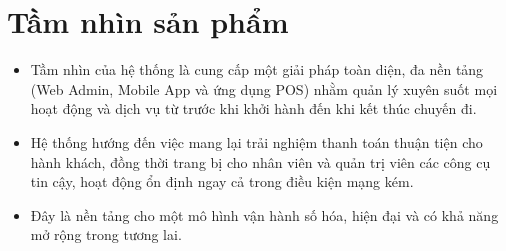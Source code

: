 \section{Tầm nhìn sản phẩm}
\begin{itemize}
    \item Tầm nhìn của hệ thống là cung cấp một giải pháp toàn diện, đa nền tảng (Web Admin, Mobile App và ứng dụng POS) nhằm quản lý xuyên suốt mọi hoạt động và dịch vụ từ trước khi khởi hành đến khi kết thúc chuyến đi.
    \item Hệ thống hướng đến việc mang lại trải nghiệm thanh toán thuận tiện cho hành khách, đồng thời trang bị cho nhân viên và quản trị viên các công cụ tin cậy, hoạt động ổn định ngay cả trong điều kiện mạng kém.
    \item Đây là nền tảng cho một mô hình vận hành số hóa, hiện đại và có khả năng mở rộng trong tương lai.
\end{itemize}
